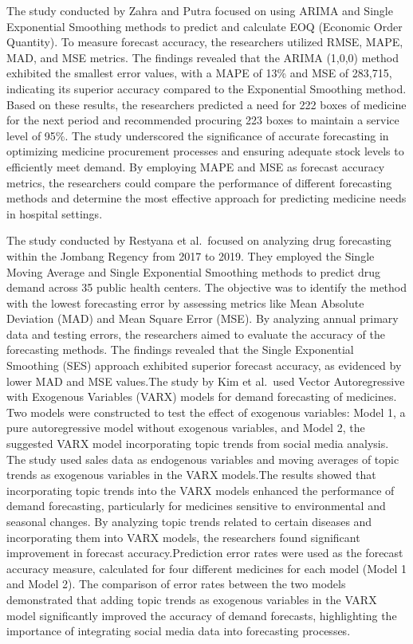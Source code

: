 \documentclass[
  authoryear,
  preprint,
  3p]{elsarticle}
\begin{document}
The study conducted by Zahra and Putra focused on using ARIMA and Single
Exponential Smoothing methods to predict and calculate EOQ (Economic
Order Quantity). To measure forecast accuracy, the researchers utilized
RMSE, MAPE, MAD, and MSE metrics. The findings revealed that the ARIMA
(1,0,0) method exhibited the smallest error values, with a MAPE of 13\%
and MSE of 283,715, indicating its superior accuracy compared to the
Exponential Smoothing method. Based on these results, the researchers
predicted a need for 222 boxes of medicine for the next period and
recommended procuring 223 boxes to maintain a service level of 95\%. The
study underscored the significance of accurate forecasting in optimizing
medicine procurement processes and ensuring adequate stock levels to
efficiently meet demand. By employing MAPE and MSE as forecast accuracy
metrics, the researchers could compare the performance of different
forecasting methods and determine the most effective approach for
predicting medicine needs in hospital
settings\citep{zahra2019forecasting}.

The study conducted by Restyana et al.~focused on analyzing drug
forecasting within the Jombang Regency from 2017 to 2019. They employed
the Single Moving Average and Single Exponential Smoothing methods to
predict drug demand across 35 public health centers. The objective was
to identify the method with the lowest forecasting error by assessing
metrics like Mean Absolute Deviation (MAD) and Mean Square Error (MSE).
By analyzing annual primary data and testing errors, the researchers
aimed to evaluate the accuracy of the forecasting methods. The findings
revealed that the Single Exponential Smoothing (SES) approach exhibited
superior forecast accuracy, as evidenced by lower MAD and MSE values.The
study by Kim et al.~used Vector Autoregressive with Exogenous Variables
(VARX) models for demand forecasting of medicines. Two models were
constructed to test the effect of exogenous variables: Model 1, a pure
autoregressive model without exogenous variables, and Model 2, the
suggested VARX model incorporating topic trends from social media
analysis. The study used sales data as endogenous variables and moving
averages of topic trends as exogenous variables in the VARX models.The
results showed that incorporating topic trends into the VARX models
enhanced the performance of demand forecasting, particularly for
medicines sensitive to environmental and seasonal changes. By analyzing
topic trends related to certain diseases and incorporating them into
VARX models, the researchers found significant improvement in forecast
accuracy.Prediction error rates were used as the forecast accuracy
measure, calculated for four different medicines for each model (Model 1
and Model 2). The comparison of error rates between the two models
demonstrated that adding topic trends as exogenous variables in the VARX
model significantly improved the accuracy of demand forecasts,
highlighting the importance of integrating social media data into
forecasting processes\citep{kim2015demand}.
\end{document}
